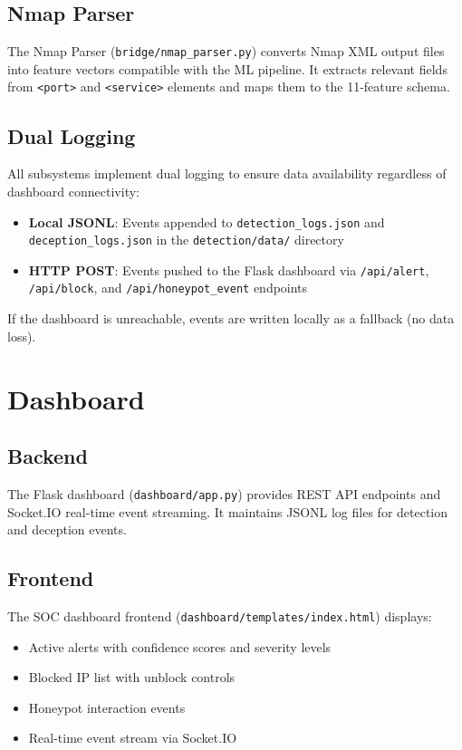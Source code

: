 \subsection{Nmap Parser}

The Nmap Parser (\texttt{bridge/nmap\_parser.py}) converts Nmap XML output files into feature vectors compatible with the ML pipeline. It extracts relevant fields from \texttt{<port>} and \texttt{<service>} elements and maps them to the 11-feature schema.

\subsection{Dual Logging}

All subsystems implement dual logging to ensure data availability regardless of dashboard connectivity:

\begin{itemize}
    \item \textbf{Local JSONL}: Events appended to \texttt{detection\_logs.json} and \texttt{deception\_logs.json} in the \texttt{detection/data/} directory
    \item \textbf{HTTP POST}: Events pushed to the Flask dashboard via \texttt{/api/alert}, \texttt{/api/block}, and \texttt{/api/honeypot\_event} endpoints
\end{itemize}

If the dashboard is unreachable, events are written locally as a fallback (no data loss).

\section{Dashboard}

\subsection{Backend}

The Flask dashboard (\texttt{dashboard/app.py}) provides REST API endpoints and Socket.IO real-time event streaming. It maintains JSONL log files for detection and deception events.

\subsection{Frontend}

The SOC dashboard frontend (\texttt{dashboard/templates/index.html}) displays:
\begin{itemize}
    \item Active alerts with confidence scores and severity levels
    \item Blocked IP list with unblock controls
    \item Honeypot interaction events
    \item Real-time event stream via Socket.IO
\end{itemize}

